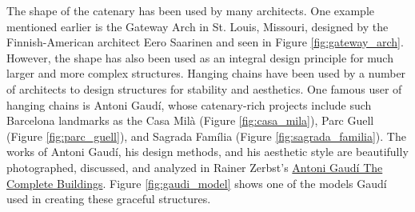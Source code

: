 \documentclass{thesis}
\begin{document}
The shape of the catenary has been used by many architects.  One example mentioned earlier is the Gateway Arch in St. Louis, Missouri, designed by
the Finnish-American architect Eero Saarinen and seen in Figure \ref{fig:gateway_arch}.  However, the shape has also been used as an integral design
principle for much larger and more complex structures.  Hanging chains have been used by a number of architects to design structures for stability and
aesthetics.  One famous user of hanging chains is Antoni Gaud\'{i}, whose catenary-rich projects include such Barcelona landmarks as the Casa Mil\`{a}
(Figure \ref{fig:casa_mila}), Parc Guell (Figure \ref{fig:parc_guell}), and Sagrada Fam\'{i}lia (Figure \ref{fig:sagrada_familia}).  The works of Antoni
Gaud\'{i}, his design methods, and his aesthetic style are beautifully photographed, discussed, and analyzed in Rainer Zerbst's
\underline{Antoni Gaud\'{i} The Complete Buildings}\cite{zerbst85gaudi}.  Figure \ref{fig:gaudi_model} shows one of the models Gaud\'{i} used in
creating these graceful structures.
\end{document}

